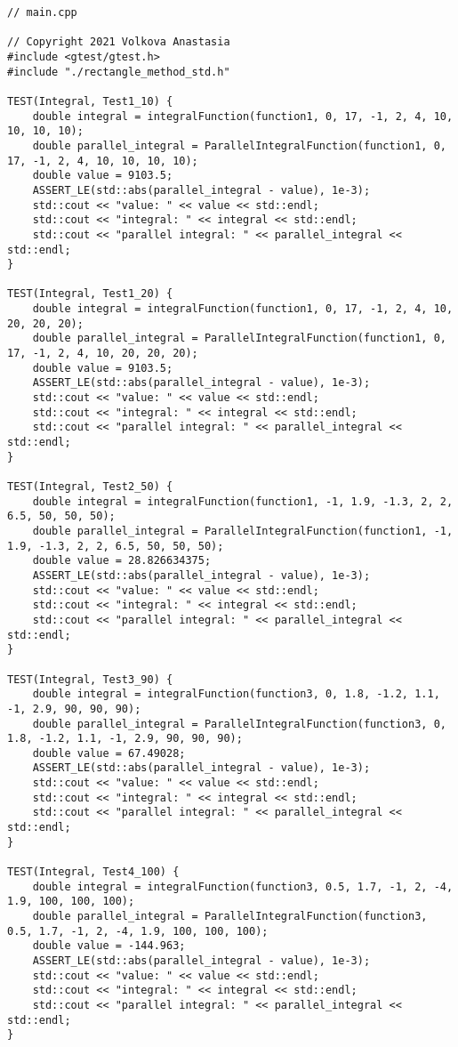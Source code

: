 \documentclass{report}
\begin{document}
\begin{lstlisting}
// main.cpp

// Copyright 2021 Volkova Anastasia
#include <gtest/gtest.h>
#include "./rectangle_method_std.h"

TEST(Integral, Test1_10) {
    double integral = integralFunction(function1, 0, 17, -1, 2, 4, 10, 10, 10, 10);
    double parallel_integral = ParallelIntegralFunction(function1, 0, 17, -1, 2, 4, 10, 10, 10, 10);
    double value = 9103.5;
    ASSERT_LE(std::abs(parallel_integral - value), 1e-3);
    std::cout << "value: " << value << std::endl;
    std::cout << "integral: " << integral << std::endl;
    std::cout << "parallel integral: " << parallel_integral << std::endl;
}

TEST(Integral, Test1_20) {
    double integral = integralFunction(function1, 0, 17, -1, 2, 4, 10, 20, 20, 20);
    double parallel_integral = ParallelIntegralFunction(function1, 0, 17, -1, 2, 4, 10, 20, 20, 20);
    double value = 9103.5;
    ASSERT_LE(std::abs(parallel_integral - value), 1e-3);
    std::cout << "value: " << value << std::endl;
    std::cout << "integral: " << integral << std::endl;
    std::cout << "parallel integral: " << parallel_integral << std::endl;
}

TEST(Integral, Test2_50) {
    double integral = integralFunction(function1, -1, 1.9, -1.3, 2, 2, 6.5, 50, 50, 50);
    double parallel_integral = ParallelIntegralFunction(function1, -1, 1.9, -1.3, 2, 2, 6.5, 50, 50, 50);
    double value = 28.826634375;
    ASSERT_LE(std::abs(parallel_integral - value), 1e-3);
    std::cout << "value: " << value << std::endl;
    std::cout << "integral: " << integral << std::endl;
    std::cout << "parallel integral: " << parallel_integral << std::endl;
}

TEST(Integral, Test3_90) {
    double integral = integralFunction(function3, 0, 1.8, -1.2, 1.1, -1, 2.9, 90, 90, 90);
    double parallel_integral = ParallelIntegralFunction(function3, 0, 1.8, -1.2, 1.1, -1, 2.9, 90, 90, 90);
    double value = 67.49028;
    ASSERT_LE(std::abs(parallel_integral - value), 1e-3);
    std::cout << "value: " << value << std::endl;
    std::cout << "integral: " << integral << std::endl;
    std::cout << "parallel integral: " << parallel_integral << std::endl;
}

TEST(Integral, Test4_100) {
    double integral = integralFunction(function3, 0.5, 1.7, -1, 2, -4, 1.9, 100, 100, 100);
    double parallel_integral = ParallelIntegralFunction(function3, 0.5, 1.7, -1, 2, -4, 1.9, 100, 100, 100);
    double value = -144.963;
    ASSERT_LE(std::abs(parallel_integral - value), 1e-3);
    std::cout << "value: " << value << std::endl;
    std::cout << "integral: " << integral << std::endl;
    std::cout << "parallel integral: " << parallel_integral << std::endl;
}


\end{lstlisting}
\end{document}
